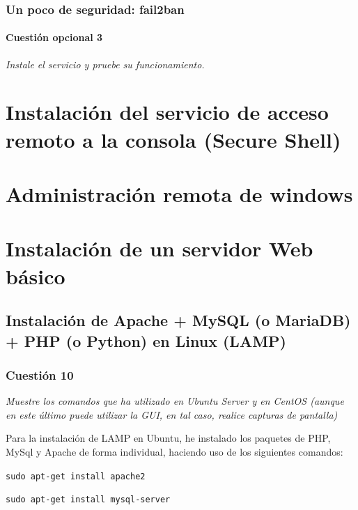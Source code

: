 \subsubsection{Un poco de seguridad: fail2ban}
\paragraph{Cuestión opcional 3}
\textit{Instale el servicio y pruebe su funcionamiento.}


\section{Instalación del servicio de acceso remoto a la consola (Secure Shell)}


\section{Administración remota de windows}


\section{Instalación de un servidor Web básico}

\subsection{Instalación de Apache + MySQL (o MariaDB) + PHP (o Python) en Linux (LAMP)}

\subsubsection{Cuestión 10}
\textit{Muestre los comandos que ha utilizado en Ubuntu Server y en CentOS (aunque en este último puede utilizar la GUI, en tal caso, realice capturas de pantalla)}
\newline

Para la instalación de LAMP en Ubuntu, he instalado los paquetes de  PHP, MySql y Apache de forma individual, haciendo uso de los siguientes comandos: \cite{l1 ,l2 ,l3} \newline

\hskip3.5cm \texttt{sudo apt-get install apache2 }

\hskip3.5cm \texttt{sudo apt-get install mysql-server }

